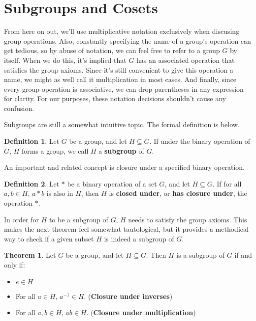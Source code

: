 \documentclass[12pt]{article}
\newcommand{\inv}[1]{#1^{-1}}
\theoremstyle{definition}
\newtheorem{definition}{Definition}[section]
\newtheorem{theorem}{Theorem}[section]
\newenvironment{thm}
{\theoremstyle{definition}
\begin{theorem}}
{\end{theorem}}
\newenvironment{defn}[1][]
{\theoremstyle{definition}
\begin{definition}{}}
{\end{definition}}
\begin{document}
\section{Subgroups and Cosets}

From here on out, we'll use multiplicative notation exclusively when discusing group operations. Also, constantly specifying the name of a group's operation can get tedious, so by abuse of notation, we can feel free to refer to a group $G$ by itself. When we do this, it's implied that $G$ has an associated operation that satisfies the group axioms. Since it's still convenient to give this operation a name, we might as well call it multiplication in most cases. And finally, since every group operation is associative, we can drop parentheses in any expression for clarity. For our purposes, these notation decisions shouldn't cause any confusion.

Subgroups are still a somewhat intuitive topic. The formal definition is below.

\begin{defn}
Let $G$ be a group, and let $H \subseteq G$. If under the binary operation of $G$, $H$ forms a group, we call $H$ a \textbf{subgroup} of $G$.
\end{defn}

An important and related concept is closure under a specified binary operation.

\begin{defn}
Let $*$ be a binary operation of a set $G$, and let $H \subseteq G$. If for all $a, b \in H$, $a*b$ is also in $H$, then $H$ is \textbf{closed under}, or \textbf{has closure under}, the operation $*$.
\end{defn}

In order for $H$ to be a subgroup of $G$, $H$ needs to satisfy the group axioms. This makes the next theorem feel somewhat tautological, but it provides a methodical way to check if a given subset $H$ is indeed a subgroup of $G$.

\begin{thm}
Let $G$ be a group, and let $H \subseteq G$. Then $H$ is a subgroup of $G$ if and only if:
\begin{itemize}
    \item $e \in H$
    \item For all $a \in H$, $\inv{a} \in H$. (\textbf{Closure under inverses})
    \item For all $a, b \in H$, $ab \in H$. (\textbf{Closure under multiplication})
\end{itemize}
\end{thm}
\end{document}
